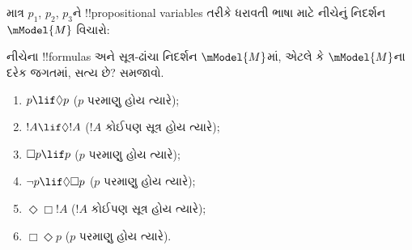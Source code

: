 \documentclass[../../../include/open-logic-section]{subfiles}
\begin{document}
\begin{prob}
  માત્ર $p_1$, $p_2$, $p_3$ને !!{propositional variable}s તરીકે
  ધરાવતી ભાષા માટે નીચેનું નિદર્શન $\mModel{M}$ વિચારો:
  \begin{center}
  \end{center}
  નીચેના !!{formula}s અને સૂત્ર-ઢાંચા નિદર્શન
  $\mModel{M}$માં, એટલે કે $\mModel{M}$ના દરેક જગતમાં, સત્ય છે?
  સમજાવો.
  \begin{enumerate}
  \item $p\lif \Diamond p$ ($p$ પરમાણુ હોય ત્યારે);
  \item $!A\lif \Diamond !A$ ($!A$ કોઈપણ સૂત્ર હોય ત્યારે);
  \item $\Box p \lif p$ ($p$ પરમાણુ હોય ત્યારે);
  \item $\lnot p \lif \Diamond \Box p$ ($p$ પરમાણુ હોય ત્યારે);
  \item $\Diamond \Box !A$ ($!A$ કોઈપણ સૂત્ર હોય ત્યારે);
  \item $\Box \Diamond p$ ($p$ પરમાણુ હોય ત્યારે).
  \end{enumerate}
\end{prob}
\end{document}
